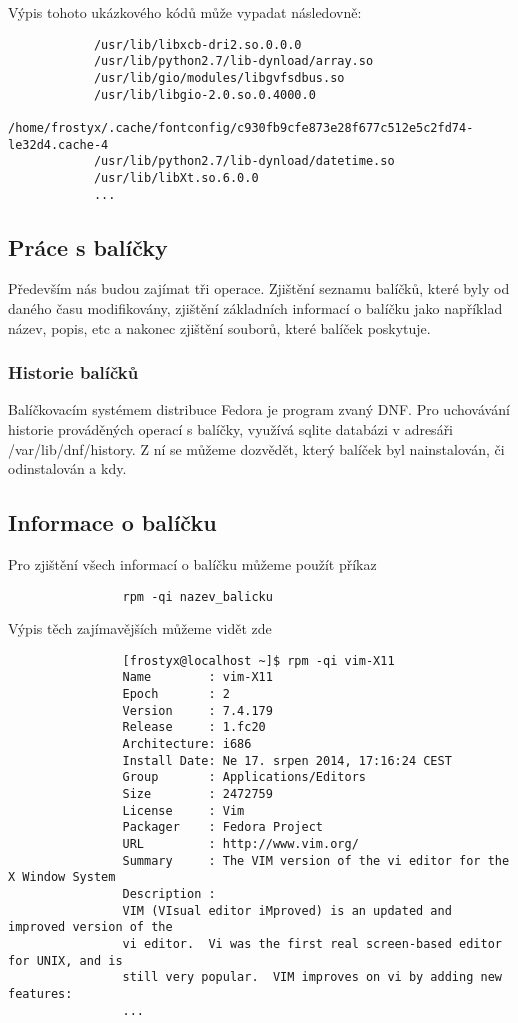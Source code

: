 \documentclass[10pt,a4paper]{article}
\begin{document}
		Výpis tohoto ukázkového kódů může vypadat následovně:
		\begin{verbatim}
			/usr/lib/libxcb-dri2.so.0.0.0
			/usr/lib/python2.7/lib-dynload/array.so
			/usr/lib/gio/modules/libgvfsdbus.so
			/usr/lib/libgio-2.0.so.0.4000.0
			/home/frostyx/.cache/fontconfig/c930fb9cfe873e28f677c512e5c2fd74-le32d4.cache-4
			/usr/lib/python2.7/lib-dynload/datetime.so
			/usr/lib/libXt.so.6.0.0
			...
		\end{verbatim}

		\subsection{Práce s balíčky}
			Především nás budou zajímat tři operace. Zjištění seznamu balíčků, které byly od daného času modifikovány, zjištění základních informací o balíčku jako například název, popis, etc a nakonec zjištění souborů, které balíček poskytuje.

			\subsubsection{Historie balíčků}
			Balíčkovacím systémem distribuce Fedora je program zvaný DNF. Pro uchovávání historie prováděných operací s balíčky, využívá sqlite databázi v adresáři /var/lib/dnf/history. Z ní se můžeme dozvědět, který balíček byl nainstalován, či odinstalován a kdy.


			\subsection{Informace o balíčku}
			Pro zjištění všech informací o balíčku můžeme použít příkaz

			\begin{verbatim}
				rpm -qi nazev_balicku
			\end{verbatim}

			Výpis těch zajímavějších můžeme vidět zde
			\begin{verbatim}
				[frostyx@localhost ~]$ rpm -qi vim-X11
				Name        : vim-X11
				Epoch       : 2
				Version     : 7.4.179
				Release     : 1.fc20
				Architecture: i686
				Install Date: Ne 17. srpen 2014, 17:16:24 CEST
				Group       : Applications/Editors
				Size        : 2472759
				License     : Vim
				Packager    : Fedora Project
				URL         : http://www.vim.org/
				Summary     : The VIM version of the vi editor for the X Window System
				Description :
				VIM (VIsual editor iMproved) is an updated and improved version of the
				vi editor.  Vi was the first real screen-based editor for UNIX, and is
				still very popular.  VIM improves on vi by adding new features:
				...
			\end{verbatim}
\end{document}

